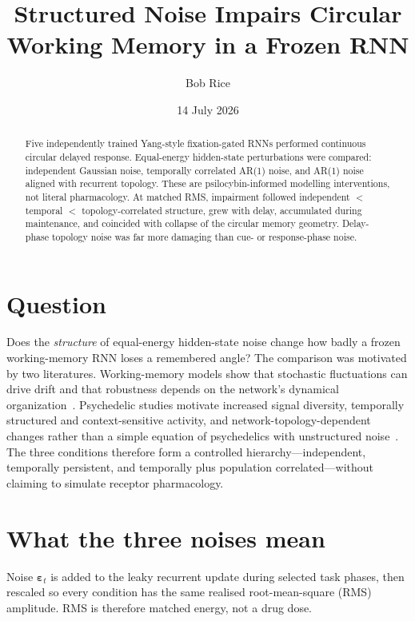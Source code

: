 \documentclass[aps,preprint,amsmath,amssymb,nofootinbib,floatfix]{revtex4-2}
\begin{document}
\title{Structured Noise Impairs Circular Working Memory in a Frozen RNN}
\author{Bob Rice}
\date{14 July 2026}

\begin{abstract}
Five independently trained Yang-style fixation-gated RNNs performed continuous circular delayed response. Equal-energy hidden-state perturbations were compared: independent Gaussian noise, temporally correlated AR(1) noise, and AR(1) noise aligned with recurrent topology. These are psilocybin-informed modelling interventions, not literal pharmacology. At matched RMS, impairment followed independent $<$ temporal $<$ topology-correlated structure, grew with delay, accumulated during maintenance, and coincided with collapse of the circular memory geometry. Delay-phase topology noise was far more damaging than cue- or response-phase noise.
\end{abstract}

\maketitle

\section{Question}

Does the \emph{structure} of equal-energy hidden-state noise change how badly a frozen working-memory RNN loses a remembered angle? The comparison was motivated by two literatures. Working-memory models show that stochastic fluctuations can drive drift and that robustness depends on the network's dynamical organization~\cite{kilpatrick2013,ghazizadeh2021}. Psychedelic studies motivate increased signal diversity, temporally structured and context-sensitive activity, and network-topology-dependent changes rather than a simple equation of psychedelics with unstructured noise~\cite{carhartharris2014,schartner2017,herzog2023,stoliker2026,bredenberg2026}. The three conditions therefore form a controlled hierarchy---independent, temporally persistent, and temporally plus population correlated---without claiming to simulate receptor pharmacology.

\section{What the three noises mean}

Noise $\boldsymbol{\varepsilon}_t$ is added to the leaky recurrent update during selected task phases, then rescaled so every condition has the same realised root-mean-square (RMS) amplitude. RMS is therefore matched energy, not a drug dose.
\end{document}
